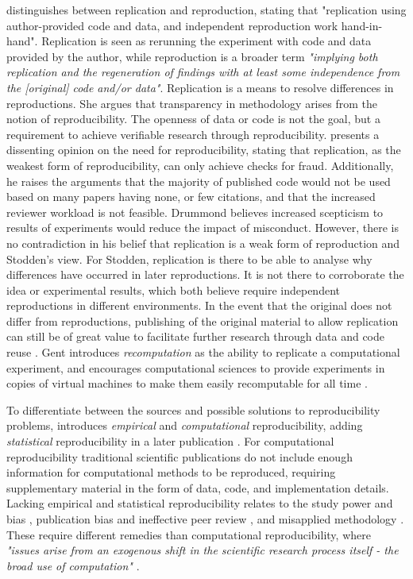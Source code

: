 \cite{stodden2011trust} distinguishes between replication and reproduction, stating that "replication using author-provided code and data, and independent reproduction work hand-in-hand". Replication is seen as rerunning the experiment with code and data provided by the author, while reproduction is a broader term \emph{"implying both replication and the regeneration of findings with at least some independence from the [original] code and/or data"}. Replication is a means to resolve differences in reproductions. She argues that transparency in methodology arises from the notion of reproducibility. The openness of data or code is not the goal, but a requirement to achieve verifiable research through reproducibility. \cite{drummond2009replicability} presents a dissenting opinion on the need for reproducibility, stating that replication, as the weakest form of reproducibility, can only achieve checks for fraud. Additionally, he raises the arguments that the majority of published code would not be used based on many papers having none, or few citations, and that the increased reviewer workload is not feasible. Drummond believes increased scepticism to results of experiments would reduce the impact of misconduct. However, there is no contradiction in his belief that replication is a weak form of reproduction and Stodden's view. For Stodden, replication is there to be able to analyse why differences have occurred in later reproductions. It is not there to corroborate the idea or experimental results, which both believe require independent reproductions in different environments. In the event that the original does not differ from reproductions, publishing of the original material to allow replication can still be of great value to facilitate further research through data and code reuse \citep{brown12blog, stodden2014best-practices}. Gent introduces \emph{recomputation} as the ability to replicate a computational experiment, and encourages computational sciences to provide experiments in copies of virtual machines to make them easily recomputable for all time \citep{gent2013recomputation}.

To differentiate between the sources and possible solutions to reproducibility problems, \cite{stodden2013resolving} introduces \emph{empirical} and \emph{computational} reproducibility, adding \emph{statistical} reproducibility in a later publication \citep{stodden2014statistical}. For computational reproducibility traditional scientific publications do not include enough information for computational methods to be reproduced, requiring supplementary material in the form of data, code, and implementation details. Lacking empirical and statistical reproducibility relates to the study power and bias \citep{Ioannidis_2005}, publication bias and ineffective peer review \citep{Francis_2012}, and misapplied methodology \citep{simmons2011false-positive}. These require different remedies than computational reproducibility, where \emph{"issues arise from an exogenous shift in the scientific research process itself - the broad use of computation"} \citep{stodden2014statistical}.

